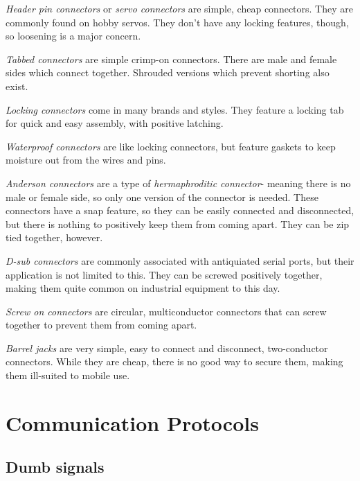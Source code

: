 \begin{asparaenum}[a)]
  \item \textit{Header pin connectors} or \textit{servo connectors} are simple, cheap connectors. They are commonly found on hobby servos. They don't have any locking features, though, so loosening is a major concern.
  \item \textit{Tabbed connectors} are simple crimp-on connectors. There are male and female sides which connect together. Shrouded versions which prevent shorting also exist.
  \item \textit{Locking connectors} come in many brands and styles. They feature a locking tab for quick and easy assembly, with positive latching.
  \item \textit{Waterproof connectors} are like locking connectors, but feature gaskets to keep moisture out from the wires and pins.
  \item \textit{Anderson connectors} are a type of \textit{hermaphroditic connector}- meaning there is no male or female side, so only one version of the connector is needed. These connectors have a snap feature, so they can be easily connected and disconnected, but there is nothing to positively keep them from coming apart. They can be zip tied together, however.
  \item \textit{D-sub connectors} are commonly associated with antiquiated serial ports, but their application is not limited to this. They can be screwed positively together, making them quite common on industrial equipment to this day.
  \item \textit{Screw on connectors} are circular, multiconductor connectors that can screw together to prevent them from coming apart.
  \item \textit{Barrel jacks} are very simple, easy to connect and disconnect, two-conductor connectors. While they are cheap, there is no good way to secure them, making them ill-suited to mobile use.
\end{asparaenum} 

\section{Communication Protocols}

\subsection{Dumb signals} %


